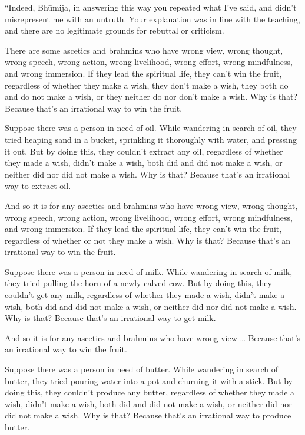 \documentclass[12pt,openany]{book}%
\begin{document}
“Indeed, \textsanskrit{Bhūmija}, in answering this way you repeated what I’ve said, and didn’t misrepresent me with an untruth. Your explanation was in line with the teaching, and there are no legitimate grounds for rebuttal or criticism. 

There are some ascetics and brahmins who have wrong view, wrong thought, wrong speech, wrong action, wrong livelihood, wrong effort, wrong mindfulness, and wrong immersion. If they lead the spiritual life, they can’t win the fruit, regardless of whether they make a wish, they don’t make a wish, they both do and do not make a wish, or they neither do nor don’t make a wish. Why is that? Because that’s an irrational way to win the fruit. 

Suppose there was a person in need of oil. While wandering in search of oil, they tried heaping sand in a bucket, sprinkling it thoroughly with water, and pressing it out. But by doing this, they couldn’t extract any oil, regardless of whether they made a wish, didn’t make a wish, both did and did not make a wish, or neither did nor did not make a wish. Why is that? Because that’s an irrational way to extract oil. 

And so it is for any ascetics and brahmins who have wrong view, wrong thought, wrong speech, wrong action, wrong livelihood, wrong effort, wrong mindfulness, and wrong immersion. If they lead the spiritual life, they can’t win the fruit, regardless of whether or not they make a wish. Why is that? Because that’s an irrational way to win the fruit. 

Suppose there was a person in need of milk. While wandering in search of milk, they tried pulling the horn of a newly-calved cow. But by doing this, they couldn’t get any milk, regardless of whether they made a wish, didn’t make a wish, both did and did not make a wish, or neither did nor did not make a wish. Why is that? Because that’s an irrational way to get milk. 

And so it is for any ascetics and brahmins who have wrong view … Because that’s an irrational way to win the fruit. 

Suppose there was a person in need of butter. While wandering in search of butter, they tried pouring water into a pot and churning it with a stick. But by doing this, they couldn’t produce any butter, regardless of whether they made a wish, didn’t make a wish, both did and did not make a wish, or neither did nor did not make a wish. Why is that? Because that’s an irrational way to produce butter. 
\end{document}
